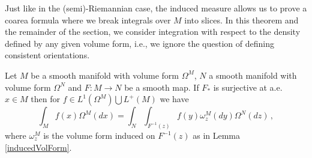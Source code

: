 Just like in the (semi)-Riemannian case, the induced measure allows us to prove a coarea formula where we break integrals over $M$ into slices. In this theorem and the remainder of the section, we consider integration with respect to the density defined by any given volume form, i.e., we ignore the question of defining consistent orientations.
\begin{theorem}\label{volFormCoarea}
Let $M$ be a smooth manifold with volume form $\Omega^M$, $N$ a smooth manifold with volume form $\Omega^N$ and $F:M\rightarrow N$ be a smooth map. If $F_*$ is surjective at a.e. $x\in M$ then for $f\in L^1(\Omega^M)\bigcup L^+(M)$ we have
\begin{equation}\label{coareaFormula}
\int_Mf(x) \Omega^M(dx)=\int_{N}\int_{F^{-1}(z)} f(y)\omega^M_z(dy) \Omega^N(dz)\,,
\end{equation}
where $\omega^M_z$ is the volume form induced on $F^{-1}(z)$ as in Lemma \ref{inducedVolForm}.
\end{theorem}
